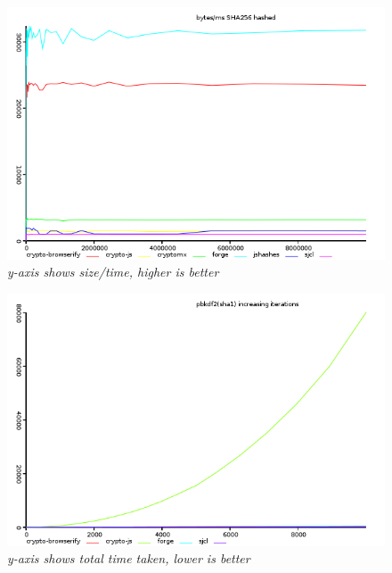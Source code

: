 \begin{figure}[htpb]
\centering
\caption{\small \sl y-axis shows size/time, higher is better
\label{fig:hash-ops-sha256}}
\includegraphics[scale=0.6]{graphs/hash-ops-sha256.png}
\end{figure} 

\begin{figure}[htpb]
\centering
\caption{\small \sl y-axis shows total time taken, lower is better
\label{fig:pbkdf2-sha1}}
\includegraphics[scale=0.6]{graphs/pbkdf2-sha1.png}
\end{figure}

